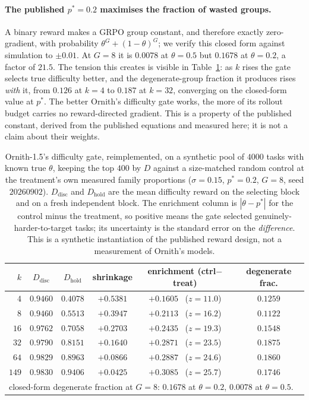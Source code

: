 \paragraph{The published $p^*=0.2$ maximises the fraction of wasted groups.} A binary
reward makes a GRPO group constant, and therefore exactly zero-gradient, with probability
$\theta^G+(1-\theta)^G$; we verify this closed form against simulation to $\pm0.01$. At
$G=8$ it is $0.0078$ at $\theta=0.5$ but $0.1678$ at $\theta=0.2$, a factor of $21.5$. The
tension this creates is visible in Table~\ref{tab:ornithgate}: as $k$ rises the gate
selects true difficulty better, and the degenerate-group fraction it produces rises
\emph{with} it, from $0.126$ at $k=4$ to $0.187$ at $k=32$, converging on the closed-form
value at $p^*$. The better Ornith's difficulty gate works, the more of its rollout budget
carries no reward-directed gradient. This is a property of the published constant, derived
from the published equations and measured here; it is not a claim about their weights.

\begin{table}[t]
\centering\small
\caption{Ornith-1.5's difficulty gate, reimplemented, on a synthetic pool of $4000$ tasks
with known true $\theta$, keeping the top $400$ by $D$ against a size-matched random
control at the treatment's own measured family proportions ($\sigma=0.15$, $p^*=0.2$,
$G=8$, seed $20260902$). $D_{\mathrm{disc}}$ and $D_{\mathrm{hold}}$ are the mean
difficulty reward on the selecting block and on a fresh independent block. The enrichment
column is $|\theta-p^*|$ for the control minus the treatment, so positive means the gate
selected genuinely-harder-to-target tasks; its uncertainty is the standard error on the
\emph{difference}. This is a synthetic instantiation of the published reward design, not a
measurement of Ornith's models.}
\label{tab:ornithgate}
\begin{tabular}{rccccc}
\toprule
$k$ & $D_{\mathrm{disc}}$ & $D_{\mathrm{hold}}$ & shrinkage & enrichment (ctrl$-$treat) & degenerate frac. \\
\midrule
$4$   & $0.9460$ & $0.4078$ & $+0.5381$ & $+0.1605$ \ ($z=11.0$) & $0.1259$ \\
$8$   & $0.9460$ & $0.5513$ & $+0.3947$ & $+0.2113$ \ ($z=16.2$) & $0.1122$ \\
$16$  & $0.9762$ & $0.7058$ & $+0.2703$ & $+0.2435$ \ ($z=19.3$) & $0.1548$ \\
$32$  & $0.9790$ & $0.8151$ & $+0.1640$ & $+0.2871$ \ ($z=23.5$) & $0.1875$ \\
$64$  & $0.9829$ & $0.8963$ & $+0.0866$ & $+0.2887$ \ ($z=24.6$) & $0.1860$ \\
$149$ & $0.9830$ & $0.9406$ & $+0.0425$ & $+0.3085$ \ ($z=25.7$) & $0.1746$ \\
\midrule
\multicolumn{6}{l}{\footnotesize closed-form degenerate fraction at $G=8$: $0.1678$ at $\theta=0.2$, $0.0078$ at $\theta=0.5$.} \\
\bottomrule
\end{tabular}
\end{table}

